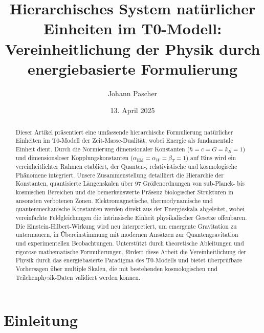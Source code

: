 \documentclass[twocolumn,aps,prl]{revtex4-2}
\begin{document}
	
	\title{Hierarchisches System natürlicher Einheiten im T0-Modell: Vereinheitlichung der Physik durch energiebasierte Formulierung}
	\author{Johann Pascher}
	\date{13. April 2025}
	
	\begin{abstract}
		Dieser Artikel präsentiert eine umfassende hierarchische Formulierung natürlicher Einheiten im T0-Modell der Zeit-Masse-Dualität, wobei Energie als fundamentale Einheit dient. Durch die Normierung dimensionaler Konstanten (\(\hbar = c = G = k_B = 1\)) und dimensionsloser Kopplungskonstanten (\(\alpha_{\text{EM}} = \alpha_W = \beta_T = 1\)) auf Eins wird ein vereinheitlichter Rahmen etabliert, der Quanten-, relativistische und kosmologische Phänomene integriert. Unsere Zusammenstellung detailliert die Hierarchie der Konstanten, quantisierte Längenskalen über 97 Größenordnungen von sub-Planck- bis kosmischen Bereichen und die bemerkenswerte Präsenz biologischer Strukturen in ansonsten verbotenen Zonen. Elektromagnetische, thermodynamische und quantenmechanische Konstanten werden direkt aus der Energieskala abgeleitet, wobei vereinfachte Feldgleichungen die intrinsische Einheit physikalischer Gesetze offenbaren. Die Einstein-Hilbert-Wirkung wird neu interpretiert, um emergente Gravitation zu untermauern, in Übereinstimmung mit modernen Ansätzen zur Quantengravitation und experimentellen Beobachtungen. Unterstützt durch theoretische Ableitungen und rigorose mathematische Formulierungen, fördert diese Arbeit die Vereinheitlichung der Physik durch das energiebasierte Paradigma des T0-Modells und bietet überprüfbare Vorhersagen über multiple Skalen, die mit bestehenden kosmologischen und Teilchenphysik-Daten validiert werden können.
	\end{abstract}
	
	\maketitle
	
	\section{Einleitung}
	\label{sec:introduction}
	
\end{document}
